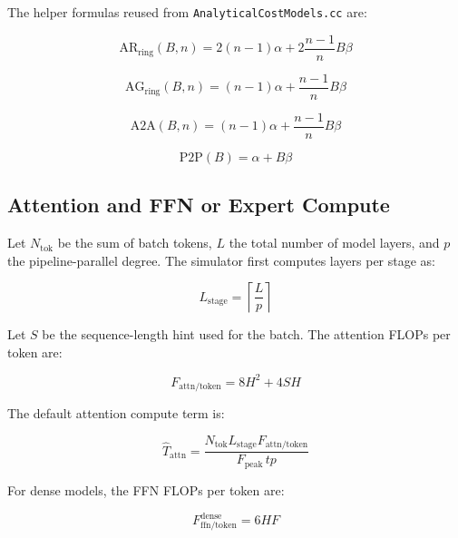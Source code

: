 The helper formulas reused from \texttt{AnalyticalCostModels.cc} are:

\begin{equation*}
\mathrm{AR}_{\mathrm{ring}}(B, n) =
2 (n - 1) \alpha + 2 \frac{n - 1}{n} B \beta
\end{equation*}

\begin{equation*}
\mathrm{AG}_{\mathrm{ring}}(B, n) =
(n - 1) \alpha + \frac{n - 1}{n} B \beta
\end{equation*}

\begin{equation*}
\mathrm{A2A}(B, n) =
(n - 1) \alpha + \frac{n - 1}{n} B \beta
\end{equation*}

\begin{equation*}
\mathrm{P2P}(B) =
\alpha + B \beta
\end{equation*}

\subsection{Attention and FFN or Expert Compute}

Let \(N_{\mathrm{tok}}\) be the sum of batch tokens, \(L\) the total number of
model layers, and \(p\) the pipeline-parallel degree. The simulator first
computes layers per stage as:

\begin{equation*}
L_{\mathrm{stage}} = \left\lceil \frac{L}{p} \right\rceil
\end{equation*}

Let \(S\) be the sequence-length hint used for the batch. The attention FLOPs
per token are:

\begin{equation*}
F_{\mathrm{attn/token}} = 8 H^2 + 4 S H
\end{equation*}

The default attention compute term is:

\begin{equation*}
\widehat{T}_{\mathrm{attn}} =
\frac{N_{\mathrm{tok}} L_{\mathrm{stage}} F_{\mathrm{attn/token}}}
{F_{\mathrm{peak}} \, tp}
\end{equation*}

For dense models, the FFN FLOPs per token are:

\begin{equation*}
F_{\mathrm{ffn/token}}^{\mathrm{dense}} = 6 H F
\end{equation*}


